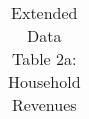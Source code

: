 \begin{longtable}{llcccccccccc}
\caption{Extended Data Table 2a: Household Revenues} \label{tab:pap__b2_sethh} \\                                                                                                                                                                                                                                                                                                                                                                                                                                                                                                                                                                                                                                                                                                                                                                                                                                 
\hline \hline                                                                                                                                                                                                                                                                                                                                                                                                                                                                                                                                                                                                                                                                                                                                                                                                                                                                                                     

\end{longtable}
